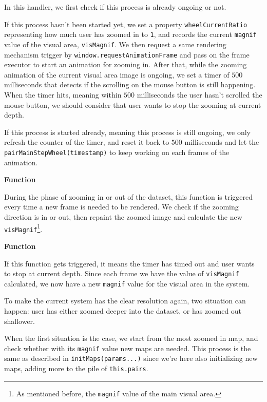 In this handler, we first check if this process is already ongoing or not.

If this process hasn't been started yet, we set a property \texttt{wheelCurrentRatio} representing how much user has zoomed in to \texttt{1}, and records the current \texttt{magnif} value of the visual area, \texttt{visMagnif}. We then request a same rendering mechanism trigger by \texttt{window.requestAnimationFrame} and pass on the frame executor  to start an animation for zooming in. After that, while the zooming animation of the current visual area image is ongoing, we set a timer of $500$ milliseconds that detects if the scrolling on the mouse button is still happening. When the timer hits, meaning within $500$ milliseconds the user hasn't scrolled the mouse button, we should consider that user wants to stop the zooming at current depth.

If this process is started already, meaning this process is still ongoing, we only refresh the counter of the timer, and reset it back to $500$ milliseconds and let the \texttt{pairMainStepWheel(timestamp)} to keep working on each frames of the animation.

\textbf{Function} 

During the phase of zooming in or out of the dataset, this function is triggered every time a new frame is needed to be rendered. We check if the zooming direction is in or out, then repaint the zoomed image and calculate the new \texttt{visMagnif}\footnote{ As mentioned before, the \texttt{magnif} value of the main visual area.}.

\textbf{Function} 

If this function gets triggered, it means the timer has timed out and user wants to stop at current depth. Since each frame we have the value of \texttt{visMagnif} calculated, we now have a new \texttt{magnif} value for the visual area in the system. 

To make the current system has the clear resolution again, two situation can happen: user has either zoomed deeper into the dataset, or has zoomed out shallower.

When the first situation is the case, we start from the most zoomed in \gls{map}, and check whether with its \texttt{magnif} value new \glspl{map} are needed. This process is the same as described in \texttt{initMaps(params...)} since we're here also initializing new \glspl{map}, adding more to the pile of \texttt{this.pairs}.

